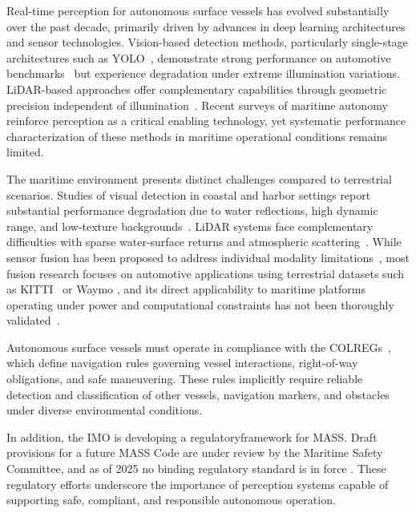\documentclass{erauthesis}
\begin{document}
Real-time perception for autonomous surface vessels has evolved substantially over the past decade, primarily driven by advances in deep learning architectures and sensor technologies. %
Vision-based detection methods, particularly single-stage architectures such as YOLO~\cite{redmon2016}, demonstrate strong performance on automotive benchmarks~\cite{geiger2013} but experience degradation under extreme illumination variations.
\ac{LiDAR}-based approaches offer complementary capabilities through geometric precision independent of illumination~\cite{zhou2018}.
Recent surveys of maritime autonomy~\cite{bae2023, zhang2021, xue2025, ferreira2022, bai2022} reinforce perception as a critical enabling technology, yet systematic performance characterization of these methods in maritime operational conditions remains limited.

The maritime environment presents distinct challenges compared to terrestrial scenarios.
Studies of visual detection in coastal and harbor settings report substantial performance degradation due to water reflections, high dynamic range, and low-texture backgrounds~\cite{prasad2017}.
\ac{LiDAR} systems face complementary difficulties with sparse water-surface returns and atmospheric scattering~\cite{kunz2005}.
While sensor fusion has been proposed to address individual modality limitations~\cite{huang2024, liang2022}, most fusion research focuses on automotive applications using terrestrial datasets such as KITTI~\cite{geiger2013} or Waymo \cite{sun2020}, and its direct applicability to maritime platforms operating under power and computational constraints has not been thoroughly validated~\cite{wang2020a}.

Autonomous surface vessels must operate in compliance with the \ac{COLREGs}~\cite{COLREGs1972}, which define navigation rules governing vessel interactions, right-of-way obligations, and safe maneuvering.
These rules implicitly require reliable detection and classification of other vessels, navigation markers, and obstacles under diverse environmental conditions.

In addition, the \ac{IMO} is developing a regulatoryframework for \ac{MASS}. 
Draft provisions for a future \ac{MASS} Code are under review by the Maritime Safety Committee, and as of 2025 no binding regulatory standard is in force \cite{IMO_MASS_RSE_2021}. 
These regulatory efforts underscore the importance of perception systems capable of supporting safe, compliant, and responsible autonomous operation.
\end{document}

